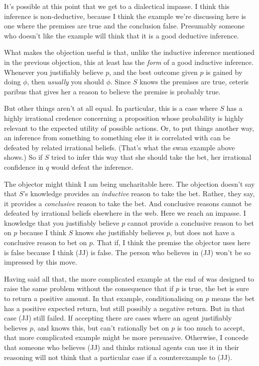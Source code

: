 {It's possible at this point that we get to a dialectical impasse. I think this inference is non-deductive, because I think the example we're discussing here is one where the premises are true and the conclusion false. Presumably someone who doesn't like the example will think that it is a good deductive inference.

What makes the objection useful is that, unlike the inductive inference mentioned in the previous objection, this at least has the \textit{form} of a good inductive inference. Whenever you justifiably believe \(p\), and the best outcome given \(p\) is gained by doing \(\phi\), then \textit{usually} you should \(\phi\). Since \(S\) knows the premises are true, ceteris paribus that gives her a reason to believe the premise is probably true.

But other things aren't at all equal. In particular, this is a case where \(S\) has a highly irrational credence concerning a proposition whose probability is highly relevant to the expected utility of possible actions. Or, to put things another way, an inference from something to something else it is correlated with can be defeated by related irrational beliefs. (That's what the swan example above shows.) So if \(S\) tried to infer this way that she should take the bet, her irrational confidence in \(q\) would defeat the inference.

The objector might think I am being uncharitable here. The objection doesn't say that \(S\)'s knowledge provides an \textit{inductive} reason to take the bet. Rather, they say, it provides a \textit{conclusive} reason to take the bet. And conclusive reasons cannot be defeated by irrational beliefs elsewhere in the web. Here we reach an impasse. I knowledge that you justifiably believe \(p\) cannot provide a conclusive reason to bet on \(p\) because I think \(S\) knows she justifiably believes \(p\), but does not have a conclusive reason to bet on \(p\). That if, I think the premise the objector uses here is false because I think (JJ) is false. The person who believes in (JJ) won't be so impressed by this move. 

Having said all that, the more complicated example at the end of \cite{Weatherson2005-WEACWD} was designed to raise the same problem without the consequence that if \(p\) is true, the bet is sure to return a positive amount. In that example, conditionalising on \(p\) means the bet has a positive expected return, but still possibly a negative return. But in that case (JJ) still failed. If accepting there are cases where an agent justifiably believes \(p\), and knows this, but can't rationally bet on \(p\) is too much to accept, that more complicated example might be more persuasive. Otherwise, I concede that someone who believes (JJ) and thinks rational agents can use it in their reasoning will not think that a particular case if a counterexample to (JJ).}

